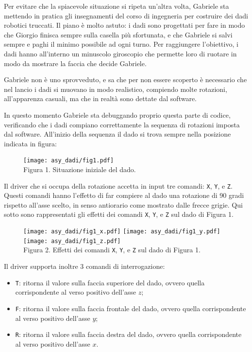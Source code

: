 Per evitare che la spiacevole situazione si ripeta un'altra volta, Gabriele sta mettendo in pratica gli insegnamenti del corso di ingegneria per costruire dei dadi robotici truccati. Il piano è molto astuto: i dadi sono progettati per fare in modo che Giorgio finisca sempre sulla casella più sfortunata, e che Gabriele si salvi sempre e paghi il minimo possibile ad ogni turno. Per raggiungere l'obiettivo, i dadi hanno all'interno un minuscolo giroscopio che permette loro di ruotare in modo da mostrare la faccia che decide Gabriele.

Gabriele non è uno sprovveduto, e sa che per non essere scoperto è necessario che nel lancio i dadi si muovano in modo realistico, compiendo molte rotazioni, all'apparenza casuali, ma che in realtà sono dettate dal software.

In questo momento Gabriele sta debuggando proprio questa parte di codice, verificando che i dadi compiano correttamente la sequenza di rotazioni imposta dal software. All'inizio della sequenza il dado si trova sempre nella posizione indicata in figura:

\begin{figure}[H]
	\centering\texttt{[image: asy\_dadi/fig1.pdf]}\\[2mm]
	Figura 1. Situazione iniziale del dado.
\end{figure}

Il driver che si occupa della rotazione accetta in input tre comandi: \texttt{X}, \texttt{Y}, e \texttt{Z}. Questi comandi hanno l'effetto di far compiere al dado una rotazione di 90 gradi rispetto all'asse scelto, in senso antiorario come mostrato dalle frecce grigie. Qui sotto sono rappresentati gli effetti dei comandi \texttt{X}, \texttt{Y}, e \texttt{Z} sul dado di Figura 1.

\begin{figure}[H]
	\centering
	\texttt{[image: asy\_dadi/fig1\_x.pdf]}\hspace{1cm}
	\texttt{[image: asy\_dadi/fig1\_y.pdf]}\hspace{1cm}
	\texttt{[image: asy\_dadi/fig1\_z.pdf]}\\[2mm]
	Figura 2. Effetti dei comandi \texttt{X}, \texttt{Y}, e \texttt{Z} sul dado di Figura 1.
\end{figure}

Il driver supporta inoltre 3 comandi di interrogazione:
\begin{itemize}[nolistsep, itemsep=2mm]
	\item \texttt{T}: ritorna il valore sulla faccia superiore del dado, ovvero quella corrispondente al verso positivo dell'asse $z$;
	\item \texttt{F}: ritorna il valore sulla faccia frontale del dado, ovvero quella corrispondente al verso positivo dell'asse $y$;
	\item \texttt{R}: ritorna il valore sulla faccia destra del dado, ovvero quella corrispondente al verso positivo dell'asse $x$.
\end{itemize}


